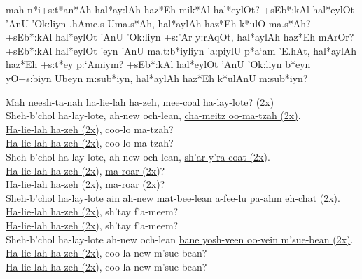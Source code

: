 \documentclass[12pt]{article}
\newenvironment{hebrewPrayer}
    {\begin{cjhebrew}
     \Large
    }
    {
    \end{cjhebrew}
    }
\newenvironment{hebrewTransliteration}{}{\par}
\begin{document}
\begin{minipage}[t]{\textwidth}
    \begin{hebrewPrayer}
        mah n*i+s:t*an*Ah hal*ay:lAh haz*Eh mik*Al hal*eylOt\textrm{?} +sEb*:kAl hal*eylOt 'AnU 'Ok:liyn .hAme.s Uma.s*Ah\textrm{,} hal*aylAh haz*Eh k*ulO ma.s*Ah\textrm{?} +sEb*:kAl hal*eylOt 'AnU 'Ok:liyn +s:'Ar y:rAqOt\textrm{,} hal*aylAh haz*Eh mArOr\textrm{?} +sEb*:kAl hal*eylOt 'eyn 'AnU ma.t:b*iyliyn 'a:piylU p*a`am 'E.hAt\textrm{,} hal*aylAh haz*Eh +s:t*ey p:`Amiym\textrm{?} +sEb*:kAl hal*eylOt 'AnU 'Ok:liyn b*eyn yO+s:biyn Ubeyn m:sub*iyn\textrm{,} hal*aylAh haz*Eh k*ulAnU m:sub*iyn\textrm{?}
    \end{hebrewPrayer}

    \begin{hebrewTransliteration}
        Mah neesh-ta-nah ha-lie-lah ha-zeh, \underline{mee-coal ha-lay-lote? (2x)} \\
        Sheh-b'chol ha-lay-lote, ah-new och-lean, \underline{cha-meitz oo-ma-tzah (2x)}. \\
        \underline{Ha-lie-lah ha-zeh (2x)}, coo-lo ma-tzah? \\
        \underline{Ha-lie-lah ha-zeh (2x)}, coo-lo ma-tzah? \\
        Sheh-b'chol ha-lay-lote, ah-new och-lean, \underline{sh'ar y'ra-coat (2x)}. \\
        \underline{Ha-lie-lah ha-zeh (2x)}, \underline{ma-roar (2x)}? \\
        \underline{Ha-lie-lah ha-zeh (2x)}, \underline{ma-roar (2x)}? \\
        Sheh-b'chol ha-lay-lote ain ah-new mat-bee-lean \underline{a-fee-lu pa-ahm eh-chat (2x)}. \\
        \underline{Ha-lie-lah ha-zeh (2x)}, sh'tay f'a-meem? \\
        \underline{Ha-lie-lah ha-zeh (2x)}, sh'tay f'a-meem? \\
        Sheh-b'chol ha-lay-lote ah-new och-lean \underline{bane yosh-veen oo-vein m'sue-bean (2x)}. \\
        \underline{Ha-lie-lah ha-zeh (2x)}, coo-la-new m'sue-bean? \\
        \underline{Ha-lie-lah ha-zeh (2x)}, coo-la-new m'sue-bean?
    \end{hebrewTransliteration}
\end{minipage}
\end{document}
